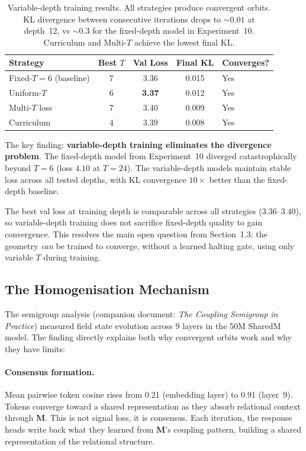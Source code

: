 \documentclass[11pt, a4paper]{article}
\newcommand{\M}{\mathbf{M}}
\theoremstyle{plain}
\theoremstyle{definition}
\theoremstyle{remark}
\begin{document}
\begin{table}[h]
\centering\small
\begin{tabular}{@{}lcccl@{}}
\toprule
\textbf{Strategy} & \textbf{Best $T$} & \textbf{Val Loss} & \textbf{Final KL} & \textbf{Converges?} \\
\midrule
Fixed-$T{=}6$ (baseline) & 7 & 3.36 & 0.015 & Yes \\
Uniform-$T$ & 6 & \textbf{3.37} & 0.012 & Yes \\
Multi-$T$ loss & 7 & 3.40 & 0.009 & Yes \\
Curriculum & 4 & 3.39 & 0.008 & Yes \\
\bottomrule
\end{tabular}
\caption{Variable-depth training results. All strategies produce convergent orbits. KL divergence between consecutive iterations drops to ${\sim}0.01$ at depth~12, vs ${\sim}0.3$ for the fixed-depth model in Experiment~10. Curriculum and Multi-$T$ achieve the lowest final KL.}
\end{table}

The key finding: \textbf{variable-depth training eliminates the divergence problem}.
The fixed-depth model from Experiment~10 diverged catastrophically beyond $T{=}6$ (loss $4.10$ at $T{=}24$).
The variable-depth models maintain stable loss across all tested depths, with KL convergence $10\times$ better than the fixed-depth baseline.

The best val loss at training depth is comparable across all strategies ($3.36$--$3.40$), so variable-depth training does not sacrifice fixed-depth quality to gain convergence.
This resolves the main open question from Section~1.3: the geometry \emph{can} be trained to converge, without a learned halting gate, using only variable $T$ during training.

\subsection{The Homogenisation Mechanism}

The semigroup analysis (companion document: \textit{The Coupling Semigroup in Practice}) measured field state evolution across 9 layers in the 50M SharedM model.
The finding directly explains both why convergent orbits work and why they have limits:

\paragraph{Consensus formation.}
Mean pairwise token cosine rises from 0.21 (embedding layer) to 0.91 (layer~9).
Tokens converge toward a shared representation as they absorb relational context through $\M$.
This is not signal loss, it is consensus.
Each iteration, the response heads write back what they learned from $\M$'s coupling pattern, building a shared representation of the relational structure.
\end{document}
